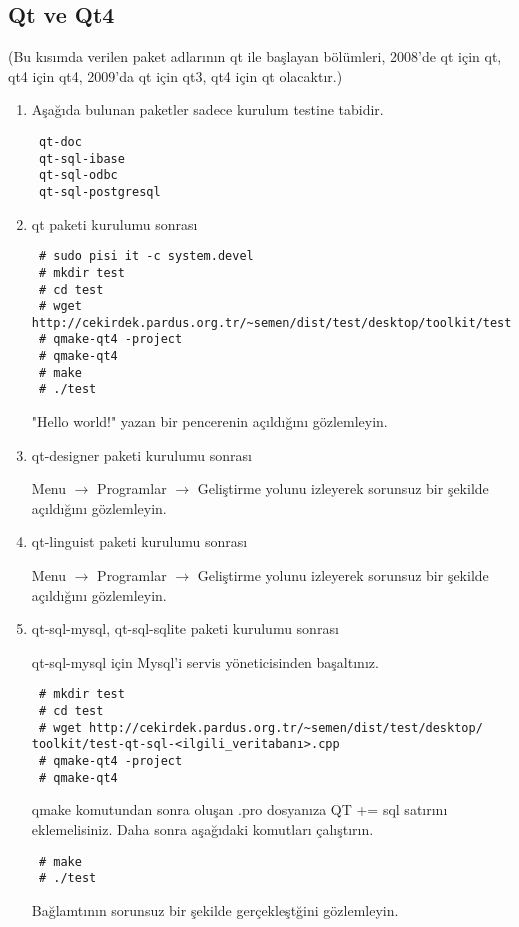 \documentclass[a4paper,10pt]{article}
\begin{document}
\subsection*{Qt ve Qt4}

(Bu kısımda verilen paket adlarının qt ile başlayan bölümleri, 2008'de qt için qt, qt4 için qt4, 2009'da qt için qt3, qt4 için qt olacaktır.)
\begin{enumerate}
 \item Aşağıda bulunan paketler sadece kurulum testine tabidir.
\begin{verbatim}
 qt-doc
 qt-sql-ibase
 qt-sql-odbc
 qt-sql-postgresql
\end{verbatim}
 \item qt paketi kurulumu sonrası

\begin{verbatim}
 # sudo pisi it -c system.devel
 # mkdir test
 # cd test
 # wget http://cekirdek.pardus.org.tr/~semen/dist/test/desktop/toolkit/test.cpp
 # qmake-qt4 -project
 # qmake-qt4
 # make
 # ./test
\end{verbatim}

"Hello world!" yazan bir pencerenin açıldığını gözlemleyin.
\item qt-designer paketi kurulumu sonrası

Menu $\rightarrow$ Programlar $\rightarrow$ Geliştirme yolunu izleyerek sorunsuz bir şekilde açıldığını gözlemleyin.

\item qt-linguist paketi kurulumu sonrası

Menu $\rightarrow$ Programlar $\rightarrow$ Geliştirme yolunu izleyerek sorunsuz bir şekilde açıldığını gözlemleyin.

\item qt-sql-mysql, qt-sql-sqlite paketi kurulumu sonrası

qt-sql-mysql için Mysql'i servis yöneticisinden başaltınız.
\begin{verbatim}
 # mkdir test
 # cd test
 # wget http://cekirdek.pardus.org.tr/~semen/dist/test/desktop/ 
toolkit/test-qt-sql-<ilgili_veritabanı>.cpp
 # qmake-qt4 -project
 # qmake-qt4	
\end{verbatim}
qmake komutundan sonra oluşan .pro dosyanıza QT += sql satırını eklemelisiniz. Daha sonra aşağıdaki komutları çalıştırın.
\begin{verbatim}
 # make
 # ./test
\end{verbatim}

Bağlamtının sorunsuz bir şekilde gerçekleştğini gözlemleyin.

\end{enumerate}
\end{document}
